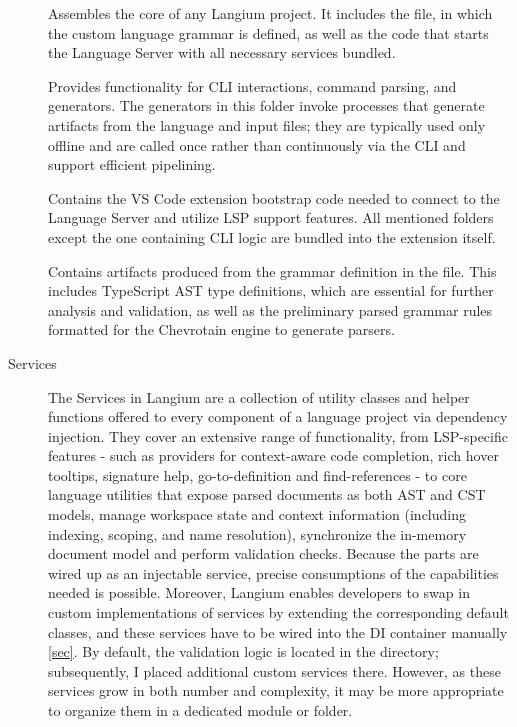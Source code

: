 \begin{description}
  \item[] Assembles the core of any Langium project. It includes the  file, in which the custom language grammar is defined, as well as
    the code that starts the Language Server with all necessary services bundled.
  \item[] Provides functionality for CLI interactions, command parsing, and generators. The generators in this folder invoke processes that generate artifacts
    from the language and input files; they are typically used only offline and are called once rather than continuously via the CLI and support efficient pipelining.
  \item[] Contains the VS Code extension bootstrap code needed to connect to the Language Server and utilize LSP support features.
    All mentioned folders except the one containing CLI logic are bundled into the extension itself.
  \item[] Contains artifacts produced from the grammar definition in the  file. This includes TypeScript AST type definitions,
    which are essential for further analysis and validation, as well as the preliminary parsed grammar rules formatted for the Chevrotain engine to generate parsers.
  \item[\textsf{Services}] The Services in Langium are a collection of utility classes and helper functions offered to every component of a language project via
    dependency injection. They cover an extensive range of functionality, from LSP-specific features - such as providers for context-aware code completion, rich hover
    tooltips, signature help, go-to-definition and find-references - to core language utilities that expose parsed documents as both AST and CST models, manage workspace
    state and context information (including indexing, scoping, and name resolution), synchronize the in-memory document model and perform validation checks.
    Because the parts are wired up as an injectable service, precise consumptions of the capabilities needed is possible. Moreover, Langium enables developers to swap in
    custom implementations of services by extending the corresponding default classes, and these services have to be wired into the DI container manually \ref{sec}.
    By default, the validation logic is located in the  directory; subsequently, I placed additional custom services there.
    However, as these services grow in both number and complexity, it may be more appropriate to organize them in a dedicated module or folder.
\end{description}

